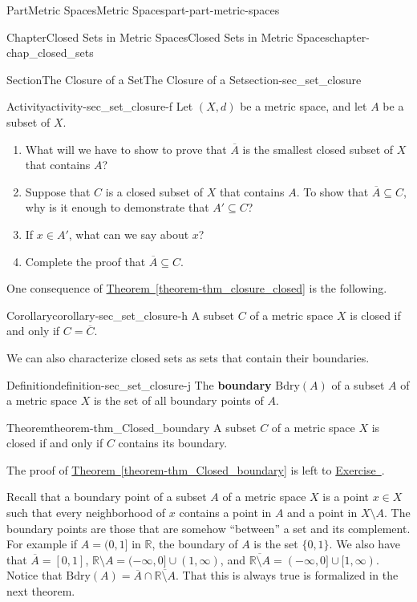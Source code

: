 \documentclass[oneside,10pt,]{book}
\newcommand{\xreffont}{\relax}
\newcommand{\terminology}[1]{\textbf{#1}}
\numberwithin{equation}{chapter}
\newcommand{\R}{\mathbb{R}}
\newcommand{\Bdry}{\text{Bdry}}
\begin{document}
\begin{partptx}{Part}{Metric Spaces}{}{Metric Spaces}{}{}{part-part-metric-spaces}
\begin{chapterptx}{Chapter}{Closed Sets in Metric Spaces}{}{Closed Sets in Metric Spaces}{}{}{chapter-chap_closed_sets}
\begin{sectionptx}{Section}{The Closure of a Set}{}{The Closure of a Set}{}{}{section-sec_set_closure}
\begin{activity}{Activity}{}{activity-sec_set_closure-f}%
Let \((X,d)\) be a metric space, and let \(A\) be a subset of \(X\).%
\begin{enumerate}[font=\bfseries,label=(\alph*),ref=\alph*]%
\item{}What will we have to show to prove that \(\overline{A}\) is the smallest closed subset of \(X\) that contains \(A\)?%
\item{}Suppose that \(C\) is a closed subset of \(X\) that contains \(A\). To show that \(\overline{A} \subseteq C\), why is it enough to demonstrate that \(A' \subseteq C\)?%
\item{}If \(x \in A'\), what can we say about \(x\)?%
\item{}Complete the proof that \(\overline{A} \subseteq C\).%
\end{enumerate}%
\end{activity}%
One consequence of \hyperref[theorem-thm_closure_closed]{Theorem~{\xreffont\ref{theorem-thm_closure_closed}}} is the following.%
\begin{corollary}{Corollary}{}{}{corollary-sec_set_closure-h}%
A subset \(C\) of a metric space \(X\) is closed if and only if \(C = \overline{C}\).%
\end{corollary}
We can also characterize closed sets as sets that contain their boundaries.%
\begin{definition}{Definition}{}{definition-sec_set_closure-j}%
The \terminology{boundary} \(\Bdry(A)\) of a subset \(A\) of a metric space \(X\) is the set of all boundary points of \(A\).%
\end{definition}
\begin{theorem}{Theorem}{}{}{theorem-thm_Closed_boundary}%
A subset \(C\) of a metric space \(X\) is closed if and only if \(C\) contains its boundary.%
\end{theorem}
The proof of \hyperref[theorem-thm_Closed_boundary]{Theorem~{\xreffont\ref{theorem-thm_Closed_boundary}}} is left to \hyperlink{exercise-ex_closed_bounded}{Exercise~{\xreffont 10}}.%
\par
Recall that a boundary point of a subset \(A\) of a metric space \(X\) is a point \(x \in X\) such that every neighborhood of \(x\) contains a point in \(A\) and a point in \(X \setminus A\). The boundary points are those that are somehow ``between'' a set and its complement. For example if \(A = (0,1]\) in \(\R\), the boundary of \(A\) is the set \(\{0,1\}\). We also have that \(\overline{A} = [0,1]\), \(\R \setminus A = (-\infty, 0] \cup (1, \infty)\), and \(\overline{\R \setminus A} = (-\infty, 0] \cup [1, \infty)\). Notice that \(\Bdry(A) = \overline{A} \cap \overline{\R \setminus A}\). That this is always true is formalized in the next theorem.%

\end{sectionptx}
\end{chapterptx}
\end{partptx}
\end{document}
